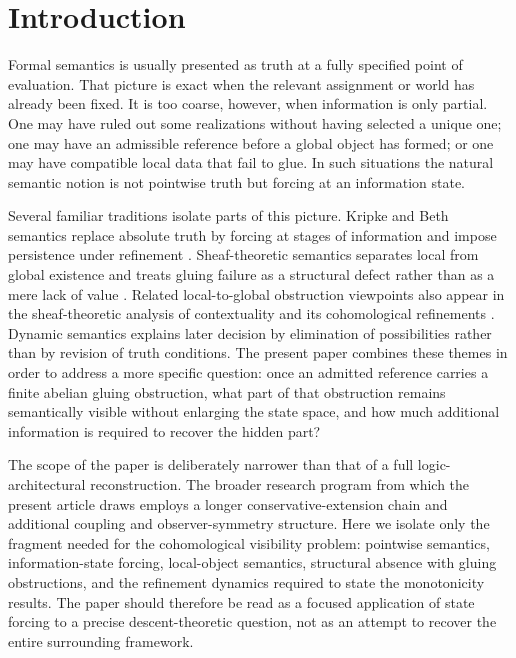 \section{Introduction}\label{sec:introduction}

Formal semantics is usually presented as truth at a fully specified point of evaluation. That picture is exact when the relevant assignment or world has already been fixed. It is too coarse, however, when information is only partial. One may have ruled out some realizations without having selected a unique one; one may have an admissible reference before a global object has formed; or one may have compatible local data that fail to glue. In such situations the natural semantic notion is not pointwise truth but forcing at an information state.

Several familiar traditions isolate parts of this picture. Kripke and Beth semantics replace absolute truth by forcing at stages of information and impose persistence under refinement \cite{Beth1956,Kripke1965,TroelstraVanDalen1988}. Sheaf-theoretic semantics separates local from global existence and treats gluing failure as a structural defect rather than as a mere lack of value \cite{MacLaneMoerdijk1994}. Related local-to-global obstruction viewpoints also appear in the sheaf-theoretic analysis of contextuality and its cohomological refinements \cite{AbramskyBrandenburger2011,Caru2017}. Dynamic semantics explains later decision by elimination of possibilities rather than by revision of truth conditions. The present paper combines these themes in order to address a more specific question: once an admitted reference carries a finite abelian gluing obstruction, what part of that obstruction remains semantically visible without enlarging the state space, and how much additional information is required to recover the hidden part?

The scope of the paper is deliberately narrower than that of a full logic-architectural reconstruction. The broader research program from which the present article draws employs a longer conservative-extension chain and additional coupling and observer-symmetry structure. Here we isolate only the fragment needed for the cohomological visibility problem: pointwise semantics, information-state forcing, local-object semantics, structural absence with gluing obstructions, and the refinement dynamics required to state the monotonicity results. The paper should therefore be read as a focused application of state forcing to a precise descent-theoretic question, not as an attempt to recover the entire surrounding framework.

